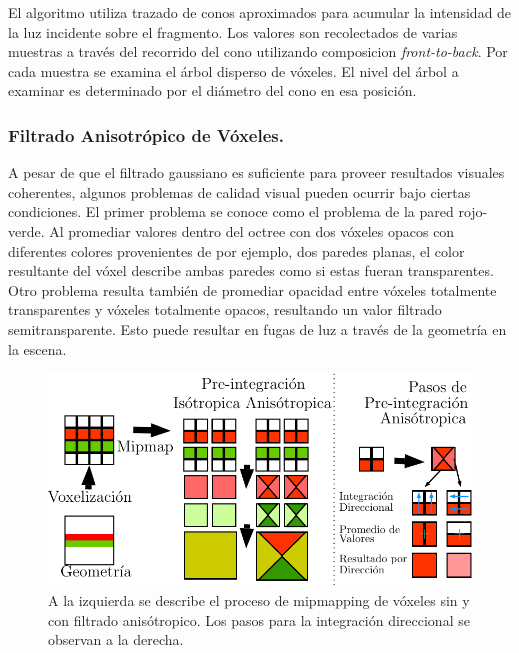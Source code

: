El algoritmo utiliza trazado de conos aproximados para acumular la intensidad de la luz incidente sobre el fragmento. Los valores son recolectados de varias muestras a través del recorrido del cono utilizando composicion \emph{front-to-back}. Por cada muestra se examina el árbol disperso de vóxeles. El nivel del árbol a examinar es determinado por el diámetro del cono en esa posición.


\subsubsection{Filtrado Anisotrópico de Vóxeles.}
\label{subsub:aniso_voxels_orig}
A pesar de que el filtrado gaussiano es suficiente para proveer resultados visuales coherentes, algunos problemas de calidad visual pueden ocurrir bajo ciertas condiciones. El primer problema se conoce como el problema de la pared rojo-verde. Al promediar valores dentro del octree con dos vóxeles opacos con diferentes colores provenientes de por ejemplo, dos paredes planas, el color resultante del vóxel describe ambas paredes como si estas fueran transparentes. Otro problema resulta también de promediar opacidad entre vóxeles totalmente transparentes y vóxeles totalmente opacos, resultando un valor filtrado semitransparente. Esto puede resultar en fugas de luz a través de la geometría en la escena.

\begin{figure}[H]
	\centering
	\includegraphics[width=0.90\linewidth]{media/isotropic_cropped.pdf}
	\caption{A la izquierda se describe el proceso de mipmapping de vóxeles sin y con filtrado anisótropico. Los pasos para la integración direccional se observan a la derecha.}
	\label{fig:vct_anisofiltering}
\end{figure}

